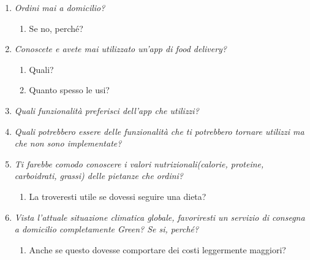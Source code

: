 \documentclass{article}
\begin{document}
    \begin{enumerate}
    
     \item \textit{Ordini mai a domicilio?}
        \begin{enumerate}
            \item Se no, perché?
        \end{enumerate}
     \item \textit{Conoscete e avete mai utilizzato un'app di food delivery?}
     \begin{enumerate}
         \item Quali?
         \item Quanto spesso le usi?
     \end{enumerate}
     \item \textit{Quali funzionalità preferisci dell'app che utilizzi?}
     \item \textit{Quali potrebbero essere delle funzionalità che ti potrebbero tornare utilizzi ma che non sono implementate?}
    \item \textit{Ti farebbe comodo conoscere i valori nutrizionali(calorie, proteine, carboidrati, grassi) delle pietanze che ordini?}
    \begin{enumerate}
        \item La troveresti utile se dovessi seguire una dieta?
    \end{enumerate}
    \item \textit{Vista l'attuale situazione climatica globale, favoriresti un servizio di consegna a domicilio completamente Green? Se si, perché? }
    \begin{enumerate}
        \item Anche se questo dovesse comportare dei costi leggermente maggiori?
    \end{enumerate}
\end{enumerate}
\end{document}
